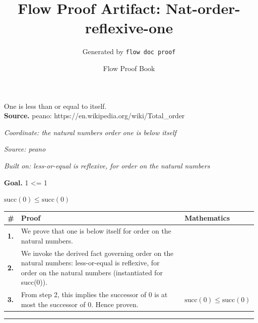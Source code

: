 \documentclass[11pt]{article}
\title{Flow Proof Artifact: Nat-order-reflexive-one}
\author{Generated by \texttt{flow doc proof}}
\date{Flow Proof Book}
\theoremstyle{definition}
\begin{document}
\maketitle
One is less than or equal to itself.\\[0.5em]
\textbf{Source.} peano: https://en.wikipedia.org/wiki/Total\_order\\[0.5em]
\bigskip
{}\par
\smallskip\noindent\textit{Coordinate: the natural numbers \cdot order \cdot one is below itself}\par
\smallskip\noindent\textit{Source: peano}\par
\smallskip\noindent\textit{Built on: less-or-equal is reflexive, for order on the natural numbers}\par
\medskip
\noindent\textbf{Goal.} 1 <= 1\par
\noindent$\displaystyle \mathrm{succ}(0) \le \mathrm{succ}(0)$\par
\medskip
\noindent
\begin{tabular}{@{} >{\raggedright\arraybackslash}p{} >{\raggedright\arraybackslash}p{} >{\raggedleft\arraybackslash}p{} @{}}
\textbf{\#} & \textbf{Proof} & \textbf{Mathematics} \\
\midrule
\textbf{1.} & We prove that one is below itself for order on the natural numbers. & \\[0.45em]
\textbf{2.} & We invoke the derived fact governing order on the natural numbers: less-or-equal is reflexive, for order on the natural numbers (instantiated for succ(0)). & \\[0.45em]
\textbf{3.} & From step 2, this implies the successor of 0 is at most the successor of 0. Hence proven. & $\displaystyle \mathrm{succ}(0) \le \mathrm{succ}(0)$ \\[0.45em]
\bottomrule
\end{tabular}
\label{thm:Nat-order-one_is_below_itself}
\par\medskip\hrule
\end{document}
